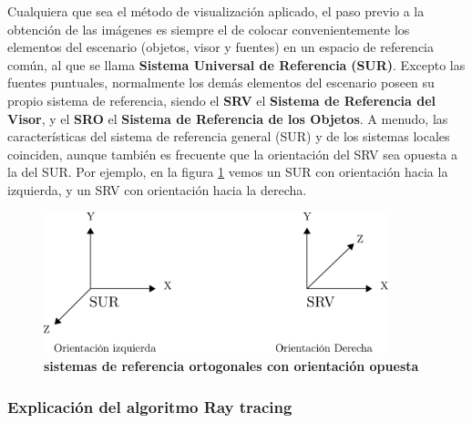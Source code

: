 Cualquiera que sea el método de visualización aplicado, el paso previo a la obtención de las imágenes es siempre el de colocar convenientemente los elementos del escenario (objetos, visor y fuentes) en un espacio de referencia
común, al que se llama \textbf{Sistema Universal de Referencia} \textbf{(SUR)}. Excepto las fuentes puntuales, normalmente los demás elementos del escenario poseen su propio sistema de referencia, siendo el \textbf{SRV} el \textbf{Sistema de Referencia del Visor}, y el \textbf{SRO} el \textbf{Sistema de Referencia de los Objetos}.
A menudo, las características del sistema de referencia general (SUR) y de los sistemas locales coinciden, aunque también es frecuente que la orientación del SRV sea opuesta a la del SUR. Por ejemplo, en la figura \ref{fig:grafica8} vemos un SUR con orientación hacia la izquierda, y un SRV con orientación hacia la derecha.

 \begin{figure}[h]
    \includegraphics[width=10cm]{Img/CPD/grafica8.png}
    \centering
    \caption{\textbf{\footnotesize{ sistemas de referencia ortogonales con orientación opuesta }}}
    \label{fig:grafica8}
    \end{figure}
    

    
\subsubsection{Explicación del algoritmo Ray tracing}

